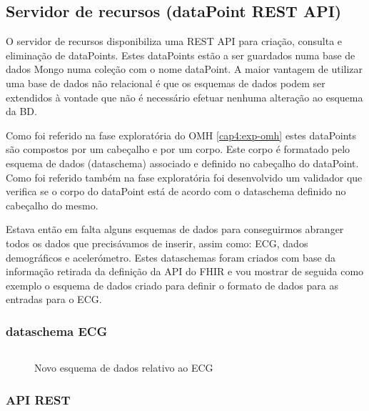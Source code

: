 \subsection{Servidor de recursos (dataPoint REST API) }
O servidor de recursos disponibiliza uma \gls{REST} \gls{API} para criação, consulta e eliminação de dataPoints. Estes dataPoints estão a ser guardados numa base de dados Mongo numa coleção com o nome dataPoint. A maior vantagem de utilizar uma base de dados não relacional é que os esquemas de dados podem ser extendidos à vontade que não é necessário efetuar nenhuma alteração ao esquema da BD. \par 
Como foi referido na fase exploratória do \gls{OMH} \ref{cap4:exp-omh} estes dataPoints são compostos por um cabeçalho e por um corpo. Este corpo é formatado pelo esquema de dados (dataschema) associado e definido no cabeçalho do dataPoint. Como foi referido também na fase exploratória foi desenvolvido um validador que verifica se o corpo do dataPoint está de acordo com o dataschema definido no cabeçalho do mesmo. \par
Estava então em falta alguns esquemas de dados para conseguirmos abranger todos os dados que precisávamos de inserir, assim como: \gls{ECG}, dados demográficos e acelerómetro. Estes dataschemas foram criados com base da informação retirada da definição da \gls{API} do \gls{FHIR} e vou mostrar de seguida como exemplo o esquema de dados criado para definir o formato de dados para as entradas para o \gls{ECG}. \newpage
\subsubsection{dataschema ECG}
\begin{figure}[H]
\inputminted[fontsize=\scriptsize]{json}{code/ecg.json}
\caption[Novo esquema de dados relativo ao ECG]{Novo esquema de dados relativo ao ECG}
\label{f:ecgjsonschema}
\end{figure}

\subsubsection{API REST}
\label{l:restapiRESOURCES}

